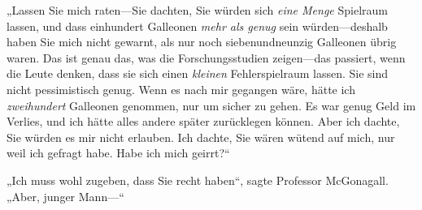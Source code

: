 „Lassen Sie mich raten—Sie dachten, Sie würden sich \emph{eine Menge} Spielraum lassen, und dass einhundert Galleonen \emph{mehr als genug} sein würden—deshalb haben Sie mich nicht gewarnt, als nur noch siebenundneunzig Galleonen übrig waren. Das ist genau das, was die Forschungsstudien zeigen—das passiert, wenn die Leute denken, dass sie sich einen \emph{kleinen} Fehlerspielraum lassen. Sie sind nicht pessimistisch genug. Wenn es nach mir gegangen wäre, hätte ich \emph{zweihundert} Galleonen genommen, nur um sicher zu gehen. Es war genug Geld im Verlies, und ich hätte alles andere später zurücklegen können. Aber ich dachte, Sie würden es mir nicht erlauben. Ich dachte, Sie wären wütend auf mich, nur weil ich gefragt habe. Habe ich mich geirrt?“

„Ich muss wohl zugeben, dass Sie recht haben“, sagte Professor McGonagall. „Aber, junger Mann—“

